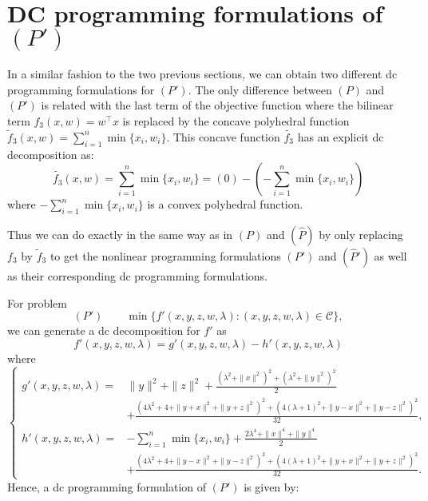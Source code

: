 \documentclass[3p]{elsarticle}
\begin{document}
\section{DC programming formulations of $(P')$}\label{sec:dcpofP'}
In a similar fashion to the two previous sections, we can obtain two different dc programming formulations for $(P')$. The only difference between $(P)$ and $(P')$ is related with the last term of the objective function where the bilinear term $f_3(x,w) = w^{\top}x$ is replaced by the concave polyhedral function $\tilde{f}_3(x,w) = \sum_{i=1}^{n} \min\{x_i,w_i\}$. This concave function $\tilde{f_3}$ has an explicit dc decomposition as: 
\begin{equation}\label{eq_f3tilde}
\tilde{f_3}(x,w) = \sum_{i=1}^{n} \min\{x_i,w_i\}= (0) - (-\sum_{i=1}^{n} \min\{x_i,w_i\})
\end{equation}
where $-\sum_{i=1}^{n} \min\{x_i,w_i\}$ is a convex polyhedral function.

Thus we can do exactly in the same way as in $(P)$ and $(\hat{P})$ by only replacing $f_3$ by $\tilde{f}_3$ to get the nonlinear programming formulations $(P')$ and $(\hat{P}')$ as well as their corresponding dc programming formulations.

For problem
\begin{equation}
(P') \qquad 
\min \{ f'(x,y,z,w,\lambda) : (x,y,z,w,\lambda)\in \mathcal{C}\},\nonumber
\end{equation}
we can generate a dc decomposition for $f'$ as 
\begin{equation}
f'(x,y,z,w,\lambda) = g'(x,y,z,w,\lambda) - h'(x,y,z,w,\lambda)
\end{equation}
where 
\begin{equation}
\left\{\begin{array}{ll}\label{eq:g'&h'}
g'(x,y,z,w,\lambda) = &\|y\|^2 + \|z\|^2 +  \frac{(\lambda^2 + \|x\|^2)^2 + (\lambda^2 + \|y\|^2)^2}{2} \\
& + \frac{(4\lambda^2+4 + \|y+x\|^2 + \|y+z\|^2)^2 + (4(\lambda+1)^2 + \|y-x\|^2 + \|y-z\|^2)^2}{32},\\
h'(x,y,z,w,\lambda) = &-\sum_{i=1}^{n} \min\{x_i,w_i\} + \frac{2\lambda^4 + \|x\|^4 + \|y\|^4}{2} \\
&+ \frac{(4\lambda^2+4 + \|y-x\|^2 + \|y-z\|^2)^2 + (4(\lambda+1)^2 + \|y+x\|^2 + \|y+z\|^2)^2}{32}.
\end{array}
\right.
\end{equation}
Hence, a dc programming formulation of $(P')$ is given by:
\end{document}
